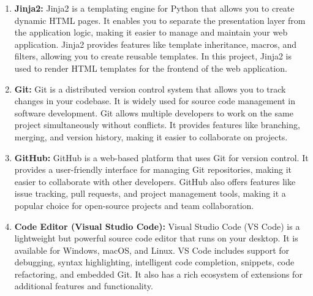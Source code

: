 \begin{enumerate}
    \item \textbf{Jinja2:}
    Jinja2 is a templating engine for Python that allows you to create dynamic
    HTML pages. It enables you to separate the presentation layer from the
    application logic, making it easier to manage and maintain your web
    application. Jinja2 provides features like template inheritance, macros,
    and filters, allowing you to create reusable templates. In this project,
    Jinja2 is used to render HTML templates for the frontend of the web
    application.

    \item \textbf{Git:}
    Git is a distributed version control system that allows you to track
    changes in your codebase. It is widely used for source code management in
    software development. Git allows multiple developers to work on the same
    project simultaneously without conflicts. It provides features like
    branching, merging, and version history, making it easier to collaborate on
    projects.

    \item \textbf{GitHub:}
    GitHub is a web-based platform that uses Git for version control. It
    provides a user-friendly interface for managing Git repositories, making it
    easier to collaborate with other developers. GitHub also offers features
    like issue tracking, pull requests, and project management tools, making it
    a popular choice for open-source projects and team collaboration.

    \item \textbf{Code Editor (Visual Studio Code):}
    Visual Studio Code (VS Code) is a lightweight but powerful source code
    editor that runs on your desktop. It is available for Windows, macOS, and
    Linux. VS Code includes support for debugging, syntax highlighting,
    intelligent code completion, snippets, code refactoring, and embedded
    Git. It also has a rich ecosystem of extensions for additional features
    and functionality.
\end{enumerate}

